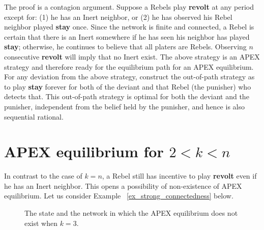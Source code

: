 \documentclass[12pt,letter]{article}
\theoremstyle{definition}
\theoremstyle{remark}
\theoremstyle{claim}
\begin{document}
The proof is a contagion argument. Suppose a Rebels play \textbf{revolt} at any period except for: (1) he has an Inert neighbor, or (2) he has observed his Rebel neighbor played \textbf{stay} once. Since the network is finite and connected, a Rebel is certain that there is an Inert somewhere if he has seen his neighbor has played \textbf{stay}; otherwise, he continues to believe that all platers are Rebels. Observing $n$ consecutive \textbf{revolt} will imply that no Inert exist. The above strategy is an APEX strategy and therefore ready for the equilibrium path for an APEX equilibrium. For any deviation from the above strategy, construct the out-of-path strategy as to play \textbf{stay} forever for both of the deviant and that Rebel (the punisher) who detects that. This out-of-path strategy is optimal for both the deviant and the punisher, independent from the belief held by the punisher, and hence is also sequential rational.


\section{APEX equilibrium for $2<k<n$}
\label{sec:equilibrium_2}

In contrast to the case of $k=n$, a Rebel still has incentive to play \textbf{revolt} even if he has an Inert neighbor. This opens a possibility of non-existence of APEX equilibrium. Let us consider Example ~\ref{ex_strong_connectedness} below.

\begin{figure}
\caption{The state and the network in which the APEX equilibrium does not exist when $k=3$.}


\begin{center}
\end{center}

\label{fig:strong_connectedness}

\end{figure}
\end{document}
